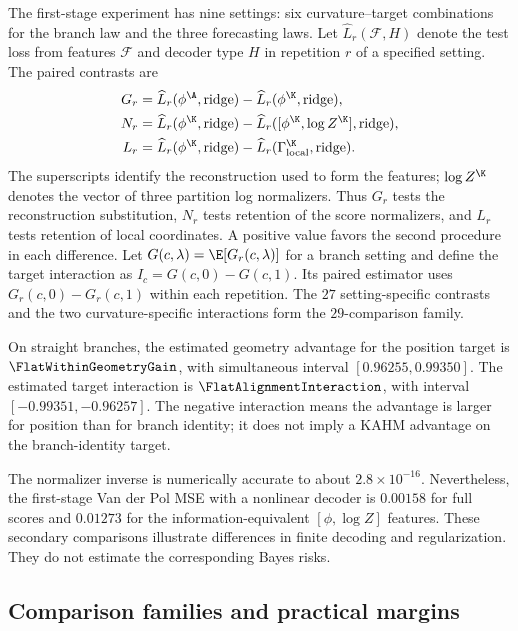 The first-stage experiment has nine settings: six curvature--target
combinations for the branch law and the three forecasting laws.
Let $\widehat L_r(\mathcal F,H)$ denote the test loss from features
$\mathcal F$ and decoder type $H$ in repetition $r$ of a specified setting.
The paired contrasts are
\begin{align*}
 G_r&=\widehat L_r(\phi^{\A},\mathrm{ridge})
       -\widehat L_r(\phi^{\K},\mathrm{ridge}),\\
 N_r&=\widehat L_r(\phi^{\K},\mathrm{ridge})
       -\widehat L_r([\phi^{\K},\log Z^{\K}],\mathrm{ridge}),\\
 L_r&=\widehat L_r(\phi^{\K},\mathrm{ridge})
       -\widehat L_r(\Gamma_{\mathrm{local}}^{\K},\mathrm{ridge}).
\end{align*}
The superscripts identify the reconstruction used to form the features;
$\log Z^{\K}$ denotes the vector of three partition log normalizers.
Thus $G_r$ tests the reconstruction substitution, $N_r$ tests retention
of the score normalizers, and $L_r$ tests retention of local coordinates.
A positive value favors the second procedure in each difference. Let
$G(c,\lambda)=\E[G_r(c,\lambda)]$ for a branch setting and define the
target interaction as $I_c=G(c,0)-G(c,1)$. Its paired estimator uses
$G_r(c,0)-G_r(c,1)$ within each repetition. The $27$ setting-specific
contrasts and the two curvature-specific interactions form the
$29$-comparison family.

On straight branches, the estimated geometry advantage for the position
target is $\FlatWithinGeometryGain$, with simultaneous interval
$[0.96255,0.99350]$. The estimated target interaction is
$\FlatAlignmentInteraction$, with interval $[-0.99351,-0.96257]$.
The negative interaction means the advantage is larger for position
than for branch identity; it does not imply a KAHM advantage on the
branch-identity target.

The normalizer inverse is numerically accurate to about
$2.8\times10^{-16}$. Nevertheless, the first-stage Van der Pol MSE
with a nonlinear decoder is $0.00158$ for full scores and $0.01273$
for the information-equivalent $[\phi,\log Z]$ features. These
secondary comparisons illustrate differences in finite decoding and
regularization. They do not estimate the corresponding Bayes risks.

\subsection{Comparison families and practical margins}


